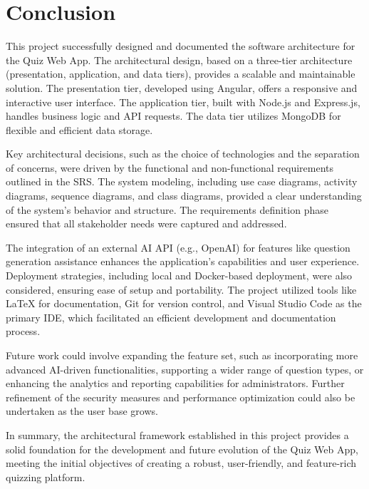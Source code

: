 \chapter{Conclusion}
\label{chap:Conclusion}
This project successfully designed and documented the software architecture for the Quiz Web App.
The architectural design, based on a three-tier architecture (presentation, application, and data tiers), provides a scalable and maintainable solution.
The presentation tier, developed using Angular, offers a responsive and interactive user interface.
The application tier, built with Node.js and Express.js, handles business logic and API requests.
The data tier utilizes MongoDB for flexible and efficient data storage.

Key architectural decisions, such as the choice of technologies and the separation of concerns, were driven by the functional and non-functional requirements outlined in the SRS.
The system modeling, including use case diagrams, activity diagrams, sequence diagrams, and class diagrams, provided a clear understanding of the system's behavior and structure.
The requirements definition phase ensured that all stakeholder needs were captured and addressed.

The integration of an external AI API (e.g., OpenAI) for features like question generation assistance enhances the application's capabilities and user experience.
Deployment strategies, including local and Docker-based deployment, were also considered, ensuring ease of setup and portability.
The project utilized tools like \LaTeX{} for documentation, Git for version control, and Visual Studio Code as the primary IDE, which facilitated an efficient development and documentation process.

Future work could involve expanding the feature set, such as incorporating more advanced AI-driven functionalities, supporting a wider range of question types, or enhancing the analytics and reporting capabilities for administrators.
Further refinement of the security measures and performance optimization could also be undertaken as the user base grows.

In summary, the architectural framework established in this project provides a solid foundation for the development and future evolution of the Quiz Web App, meeting the initial objectives of creating a robust, user-friendly, and feature-rich quizzing platform.

